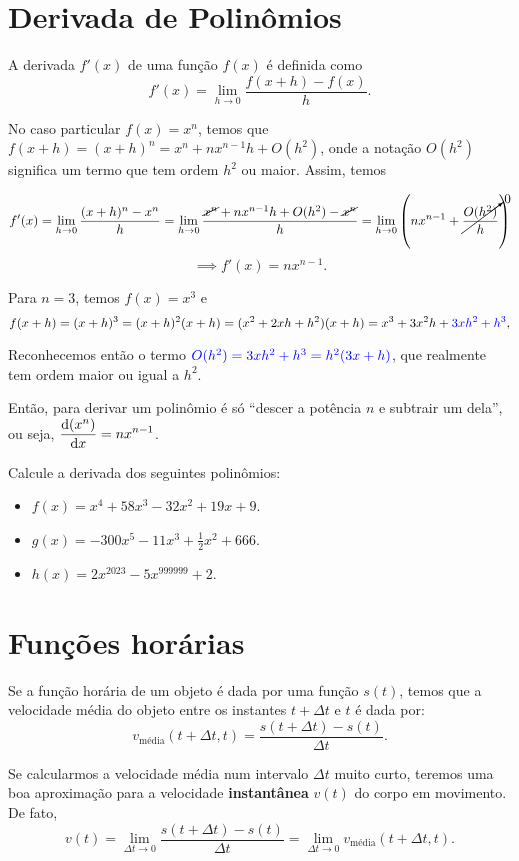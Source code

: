 \documentclass[a4paper,fleqn,12pt]{article}
\begin{document}
\pagebreak

\section{Derivada de Polinômios}

A derivada $f'(x)$ de uma função $f(x)$ é definida como
$$
f'(x) = \lim_{h \to 0} \frac{f(x + h) - f(x)}{h}.
$$

No caso particular $f(x) = x^n$, temos que $f(x + h) = (x + h)^n = x^n + n x^{n-1} h + O(h^2)$, onde a notação $O(h^2)$ significa um termo que tem ordem $h^2$ ou maior. Assim, temos

$$
f'(x) = \lim_{h \to 0} \frac{(x + h)^n - x^n}{h} =
\lim_{h \to 0} \frac{\cancel{x^n} + nx^{n-1} h + O(h^2) - \cancel{x^n}}{h} =
\lim_{h \to 0} \qty( n x^{n-1} + \cancelto{0}{\frac{O(h^2)}{h}} )
$$
$$
\implies f'(x) = n x^{n-1}.
$$

Para $n = 3$, temos $f(x) = x^3$ e
$$
f(x + h) = (x + h)^3 = (x + h)^2 (x + h) = (x^2 + 2xh + h^2) (x + h) = x^3 + 3 x^2 h + \textcolor{blue}{3 x h^2 + h^3},
$$

Reconhecemos então o termo $\textcolor{blue}{O(h^2) = 3x h^2 + h^3 = h^2 ( 3x + h )}$, que realmente tem ordem maior ou igual a $h^2$.

Então, para derivar um polinômio é só ``descer a potência $n$ e subtrair um dela'', ou seja, $\displaystyle{\dv{(x^n)}{x} = n x^{n-1}}$.

\n\n

Calcule a derivada dos seguintes polinômios:
\begin{itemize}
\item $f(x) = x^4 + 58 x^3 - 32 x^2 + 19 x + 9$.
\item $g(x) = - 300 x^5 - 11 x^3 + \frac{1}{2} x^2 + 666$.
\item $h(x) = 2 x^{2023} - 5 x^{999999} + 2$.
\end{itemize}

\pagebreak


\section{Funções horárias}

Se a função horária de um objeto é dada por uma função $s(t)$, temos que a velocidade média do objeto entre os instantes $t+\Delta t$ e $t$ é dada por:
$$
v_{\text{média}} (t+\Delta t, t) = \frac{s(t+\Delta t) - s(t)}{\Delta t}.
$$

Se calcularmos a velocidade média num intervalo $\Delta t$ muito curto, teremos uma boa aproximação para a velocidade \textbf{instantânea} $v(t)$ do corpo em movimento. De fato,
$$
v(t) = \lim_{\Delta t \to 0} \frac{s(t+\Delta t) - s(t)}{\Delta t} = \lim_{\Delta t \to 0} v_{\text{média}} (t+\Delta t, t).
$$
\end{document}
